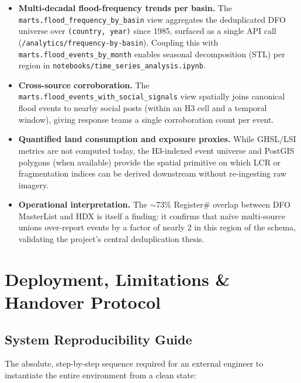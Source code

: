 \documentclass[11pt,a4paper]{article}
\begin{document}
\begin{itemize}
    \item \textbf{Multi-decadal flood-frequency trends per basin.} The
    \texttt{marts.flood\_frequency\_by\_basin} view aggregates the
    deduplicated DFO universe over \texttt{(country, year)} since 1985,
    surfaced as a single API call (\texttt{/analytics/frequency-by-basin}).
    Coupling this with \texttt{marts.flood\_events\_by\_month} enables
    seasonal decomposition (STL) per region in
    \texttt{notebooks/time\_series\_analysis.ipynb}.

    \item \textbf{Cross-source corroboration.} The
    \texttt{marts.flood\_events\_with\_social\_signals} view spatially
    joins canonical flood events to nearby social posts (within an H3 cell
    and a temporal window), giving response teams a single corroboration
    count per event.

    \item \textbf{Quantified land consumption and exposure proxies.} While
    GHSL/LSI metrics are not computed today, the H3-indexed event
    universe and PostGIS polygons (when available) provide the spatial
    primitive on which LCR or fragmentation indices can be derived
    downstream without re-ingesting raw imagery.

    \item \textbf{Operational interpretation.} The $\sim$73\% Register\#
    overlap between DFO MasterList and HDX is itself a finding: it
    confirms that na\"ive multi-source unions over-report events by a
    factor of nearly 2 in this region of the schema, validating the
    project's central deduplication thesis.
\end{itemize}

\section{Deployment, Limitations \& Handover Protocol}

\subsection{System Reproducibility Guide}

The absolute, step-by-step sequence required for an external engineer to
instantiate the entire environment from a clean state:
\end{document}
